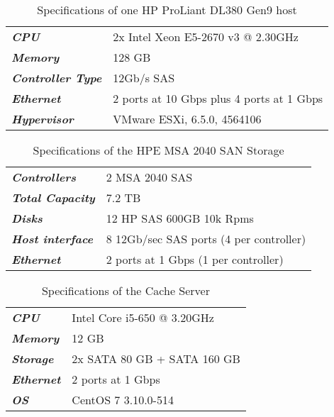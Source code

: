 \begin{table}[htpb]
\centering
\begin{tabular}{ll}
\textit{\textbf{CPU}}             & 2x Intel Xeon E5-2670 v3 @ 2.30GHz        \\
\textit{\textbf{Memory}}          & 128 GB                                    \\
\textit{\textbf{Controller Type}} & 12Gb/s SAS                                \\
\textit{\textbf{Ethernet}}        & 2 ports at 10 Gbps plus 4 ports at 1 Gbps \\
\textit{\textbf{Hypervisor}}      & VMware ESXi, 6.5.0, 4564106              
\end{tabular}
\caption{Specifications of one HP ProLiant DL380 Gen9 host}
\label{tab:imple_hp}
\end{table}

\newpage

\begin{table}[htpb]
\centering
\begin{tabular}{ll}
\textit{\textbf{Controllers}}    & 2 MSA 2040 SAS                          \\
\textit{\textbf{Total Capacity}} & 7.2 TB                                  \\
\textit{\textbf{Disks}}          & 12 HP SAS 600GB 10k Rpms                \\
\textit{\textbf{Host interface}} & 8 12Gb/sec SAS ports (4 per controller) \\
\textit{\textbf{Ethernet}}       & 2 ports at 1 Gbps (1 per controller)   
\end{tabular}
\caption{Specifications of the HPE MSA 2040 SAN Storage}
\label{tab:imple_msa}
\end{table}

\begin{table}[htpb]
\centering
\begin{tabular}{ll}
\textit{\textbf{CPU}} 		& Intel Core i5-650 @ 3.20GHz \\
\textit{\textbf{Memory}} 	& 12 GB \\
\textit{\textbf{Storage}} 	& 2x SATA 80 GB  + SATA 160 GB \\
\textit{\textbf{Ethernet}} 	& 2 ports at 1 Gbps \\
\textit{\textbf{OS}} 		& CentOS 7 3.10.0-514
\end{tabular}
\caption{Specifications of the Cache Server}
\label{tab:imple_cs}
\end{table}



